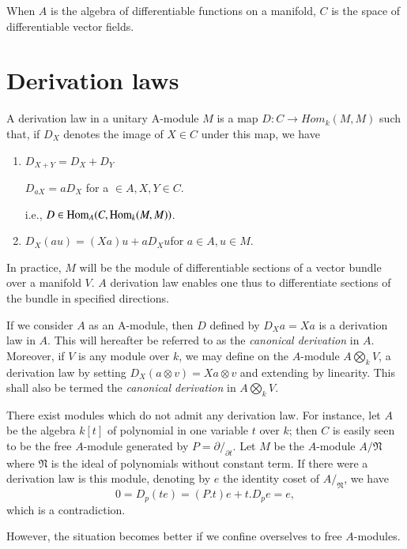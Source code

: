 When $A$ is the algebra of differentiable functions on a manifold, $C$
is the space of differentiable vector fields. 

\section{Derivation laws}\label{chap1:sec2}%

\begin{defn}\label{chap1:sec2:def2}%
  A derivation law in a unitary A-module $M$ is a map $D :  C
  \to Hom_k (M,M)$ such that, if $D_X$ denotes the image of $X \in C$
  under this map, we have 
  \begin{enumerate}[\rm i)]
  \item $D_{X+Y} = D_X +D_Y$
       
    $D_{aX}  = a D_{X}$  for a $\in A, X,Y \in C$.
    
    i.e., \quad $D \in \operatorname{Hom}_A (C, \operatorname{Hom}_k (M,M))$.
  \item $D_X (au) =(Xa) u+a D_X u$\pageoriginale for $a \in  A, u \in M$.
  \end{enumerate} 
\end{defn}

In practice, $M$ will be the module of differentiable sections of a
vector bundle over a manifold $V$. $A$ derivation law enables one thus
to differentiate sections of the bundle in specified directions. 

If we consider $A$ as an A-module, then  $D$ defined by $D_X a = Xa$
is a derivation law in $A$. This  will hereafter be referred to as the
\textit{canonical derivation} in $A$. Moreover, if $V$ is any module
over $k$, we may define on the $A$-module $A  \bigotimes \limits_k V$,
a derivation law by setting $D_X(a \otimes v)= Xa \otimes v$ and
extending by linearity. This shall also be termed the
\textit{canonical derivation} in $A \bigotimes \limits_k V$. 

There exist modules which do not admit any  derivation law. For
instance, let $A$ be the algebra $k[t]$ of polynomial in one variable
$t$ over $k$; then $C$ is easily seen to be the free $A$-module
generated by $P= \partial/ _{\partial t}$. Let $M$  be the
$A$-module $A / \mathfrak{N}$ where $\mathfrak{N}$ is the ideal of
polynomials without constant term. If there were a derivation law is
this module, denoting by $e$ the identity coset of $A/ _\mathfrak{N}$,
we have  
$$
0=  D_p(te) =  (P.t) e + t. D_p e = e,
$$
which is a contradiction.

However, the situation becomes better if we confine overselves to free
$A$-modules. 

